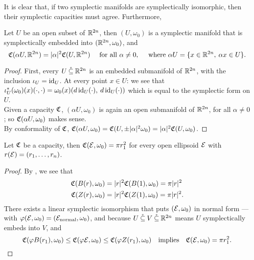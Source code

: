 \documentclass[../main-v2-manifolds.tex]{subfiles}
\begin{document}
It is clear that, if two symplectic manifolds are symplectically isomorphic, then their symplectic capacities must agree. Furthermore,
\begin{wts}\label{thm:symplectic capacity scaling open subsets}
    Let $U$ be an open subset of ${\mathbb{R}^{2n}}$, then $(U,\omega_0)$ is a symplectic manifold that is symplectically embedded into $({\mathbb{R}^{2n}},\omega_0)$, and 
    \[
        \mathfrak{C}(\alpha U,{\mathbb{R}^{2n}}) = \vert {\alpha} \vert^2\mathfrak{C}(U,{\mathbb{R}^{2n}})\quad\text{ for all }\alpha\neq 0,\quad\text{ where } \alpha U = \{x\in{\mathbb{R}^{2n}},\: \alpha x\in U\}.
    \]
\end{wts}
\begin{proof}
    First, every $U\:\mathring{\subseteq}\:{\mathbb{R}^{2n}}$ is an embedded submanifold of ${\mathbb{R}^{2n}}$, with the inclusion $\iota_{U} = \operatorname{id}_{U}$. At every point $x\in U$: we see that $\iota_U^{*}(\omega_0)(x)(\cdot,\cdot) = \omega_0(x)(d\operatorname{id}_{U}(\cdot),\: d\operatorname{id}_{U}(\cdot))$ which is equal to the symplectic form on $U$.\\

    Given a capacity $\mathfrak{C}$, $(\alpha U,\omega_0)$ is again an open submanifold of ${\mathbb{R}^{2n}}$, for all $\alpha\neq 0$; so $\mathfrak{C}(\alpha U,\omega_0)$ makes sense. \\
    By conformality of $\mathfrak{C}$, $\mathfrak{C}(\alpha U,\omega_0) = \mathfrak{C}(U,\pm\vert {\alpha} \vert^2\omega_0) = \vert {\alpha} \vert^2\mathfrak{C}(U,\omega_0)$.
\end{proof}
\begin{wts}
    Let $\mathfrak{C}$ be a capacity, then $\mathfrak{C}(\mathcal{E},\omega_0) = \pi r_1^2$ for every open ellipsoid $\mathcal{E}$ with $r(\mathcal{E}) = (r_1,\ldots, r_n)$.
\end{wts}
\begin{proof}
    By , we see that
    \begin{align}
        \mathfrak{C}(B(r),\omega_0) &= \vert {r} \vert^2\mathfrak{C}(B(1),\omega_0) = \pi\vert {r} \vert^2\\
        \mathfrak{C}(Z(r),\omega_0) &= \vert {r} \vert^2\mathfrak{C}(Z(1),\omega_0) = \pi\vert {r} \vert^2.
    \end{align}
    There exists a linear symplectic isomorphism that puts $(\mathcal{E},\omega_0)$ in normal form --- with $\varphi(\mathcal{E},\omega_0) = (\mathcal{E}_{\mathrm{normal}}, \omega_0)$, and because $U\:\mathring{\subseteq}\: V\:\mathring{\subseteq}\: {\mathbb{R}^{2n}}$ means $U$ symplectically embeds into $V$, and
    \[
        \frakc(\varphi B(r_1),\omega_0)\leq \frakc(\varphi\Epsilon,\omega_0)\leq \frakc(\varphi Z(r_1),\omega_0)\qqtext{implies} \frakc(\Epsilon,\omega_0) = \pi r_1^2.
    \]
\end{proof}
\end{document}

